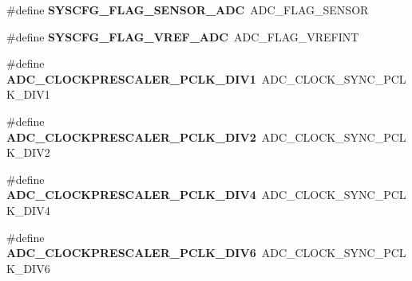 \begin{DoxyCompactItemize}
\item 
\mbox{\label{group___h_a_l___a_d_c___aliased___defines_ga48929ac8156ee0ea52c25ad3ec9fed11}} 
\#define {\bfseries S\+Y\+S\+C\+F\+G\+\_\+\+F\+L\+A\+G\+\_\+\+S\+E\+N\+S\+O\+R\+\_\+\+A\+DC}~A\+D\+C\+\_\+\+F\+L\+A\+G\+\_\+\+S\+E\+N\+S\+OR
\item 
\mbox{\label{group___h_a_l___a_d_c___aliased___defines_gaa7f5151463037ce60032a869f3e71665}} 
\#define {\bfseries S\+Y\+S\+C\+F\+G\+\_\+\+F\+L\+A\+G\+\_\+\+V\+R\+E\+F\+\_\+\+A\+DC}~A\+D\+C\+\_\+\+F\+L\+A\+G\+\_\+\+V\+R\+E\+F\+I\+NT
\item 
\mbox{\label{group___h_a_l___a_d_c___aliased___defines_gaaf80e00044e185957328f1d59bacdf37}} 
\#define {\bfseries A\+D\+C\+\_\+\+C\+L\+O\+C\+K\+P\+R\+E\+S\+C\+A\+L\+E\+R\+\_\+\+P\+C\+L\+K\+\_\+\+D\+I\+V1}~A\+D\+C\+\_\+\+C\+L\+O\+C\+K\+\_\+\+S\+Y\+N\+C\+\_\+\+P\+C\+L\+K\+\_\+\+D\+I\+V1
\item 
\mbox{\label{group___h_a_l___a_d_c___aliased___defines_ga058aa1143f9f7f123362039c9efcf4cb}} 
\#define {\bfseries A\+D\+C\+\_\+\+C\+L\+O\+C\+K\+P\+R\+E\+S\+C\+A\+L\+E\+R\+\_\+\+P\+C\+L\+K\+\_\+\+D\+I\+V2}~A\+D\+C\+\_\+\+C\+L\+O\+C\+K\+\_\+\+S\+Y\+N\+C\+\_\+\+P\+C\+L\+K\+\_\+\+D\+I\+V2
\item 
\mbox{\label{group___h_a_l___a_d_c___aliased___defines_ga98bc3d5a9f7e069183a205c8458a6645}} 
\#define {\bfseries A\+D\+C\+\_\+\+C\+L\+O\+C\+K\+P\+R\+E\+S\+C\+A\+L\+E\+R\+\_\+\+P\+C\+L\+K\+\_\+\+D\+I\+V4}~A\+D\+C\+\_\+\+C\+L\+O\+C\+K\+\_\+\+S\+Y\+N\+C\+\_\+\+P\+C\+L\+K\+\_\+\+D\+I\+V4
\item 
\mbox{\label{group___h_a_l___a_d_c___aliased___defines_gae5cbf680825b9ccaa02bdbab9217f550}} 
\#define {\bfseries A\+D\+C\+\_\+\+C\+L\+O\+C\+K\+P\+R\+E\+S\+C\+A\+L\+E\+R\+\_\+\+P\+C\+L\+K\+\_\+\+D\+I\+V6}~A\+D\+C\+\_\+\+C\+L\+O\+C\+K\+\_\+\+S\+Y\+N\+C\+\_\+\+P\+C\+L\+K\+\_\+\+D\+I\+V6
\item 
\mbox{\label{group___h_a_l___a_d_c___aliased___defines_ga93ccda8f421de00a2aa5b0b19b665393}} 

\end{DoxyCompactItemize}
